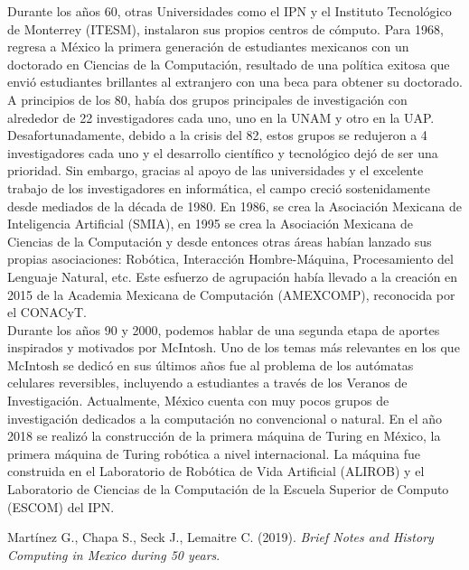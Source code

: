 \documentclass[a4paper,12pt]{article}
\begin{document}
	Durante los años 60, otras Universidades como el IPN y el Instituto Tecnológico de Monterrey (ITESM), instalaron sus propios centros de cómputo. Para 1968, regresa a México la primera generación de estudiantes mexicanos con un doctorado en Ciencias de la Computación, resultado de una política exitosa que envió estudiantes brillantes al extranjero con una beca para obtener su doctorado. A principios de los 80, había dos grupos principales de investigación con alrededor de 22 investigadores cada uno, uno en la UNAM y otro en la UAP. Desafortunadamente, debido a la crisis del 82, estos grupos se redujeron a 4 investigadores cada uno y el desarrollo científico y tecnológico dejó de ser una prioridad. Sin embargo, gracias al apoyo de las universidades y el excelente trabajo de los investigadores en informática, el campo creció sostenidamente desde mediados de la década de 1980. En 1986, se crea la Asociación Mexicana de Inteligencia Artificial (SMIA), en 1995 se crea la Asociación Mexicana de Ciencias de la Computación y desde entonces otras áreas habían lanzado sus propias asociaciones: Robótica, Interacción Hombre-Máquina, Procesamiento del Lenguaje Natural, etc. Este esfuerzo de agrupación había llevado a la creación en 2015 de la Academia Mexicana de Computación (AMEXCOMP), reconocida por el CONACyT.\\
	Durante los años 90 y 2000, podemos hablar de una segunda etapa de aportes inspirados y motivados por McIntosh. Uno de los temas más relevantes en los que McIntosh se dedicó en sus últimos años fue al problema de los autómatas celulares reversibles, incluyendo a estudiantes a través de los Veranos de Investigación. Actualmente, México cuenta con muy pocos grupos de investigación dedicados a la computación no convencional o natural. En el año 2018 se realizó la construcción de la primera máquina de Turing en México, la primera máquina de Turing robótica a nivel internacional. La máquina fue construida en el Laboratorio de Robótica de Vida Artificial (ALIROB) y el Laboratorio de Ciencias de la Computación de la Escuela Superior de Computo (ESCOM) del IPN.
	
	\begin{thebibliography}{9}
		Martínez G., Chapa S., Seck J., Lemaitre C. (2019). \emph{Brief Notes and History Computing in Mexico during 50 years}. 
	\end{thebibliography}
	
	
\end{document}
